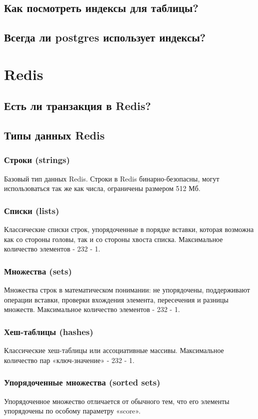 \section{Как посмотреть индексы для таблицы?}
\section{Всегда ли postgres использует индексы?}

\chapter{Redis}

\section{Есть ли транзакция в Redis?}
\section{Типы данных Redis}
\subsection{Строки (strings)}
Базовый тип данных Redis. Строки в Redis бинарно-безопасны, могут использоваться так же как числа, ограничены размером 512 Мб.
\subsection{Списки (lists)}
Классические списки строк, упорядоченные в порядке вставки, которая возможна как со стороны головы, так и со стороны хвоста списка. Максимальное количество элементов - 232 - 1.
\subsection{Множества (sets)}    
Множества строк в математическом понимании: не упорядочены, поддерживают операции вставки, проверки вхождения элемента, пересечения и разницы множеств. Максимальное количество элементов - 232 - 1.
\subsection{Хеш-таблицы (hashes)}    
Классические хеш-таблицы или ассоциативные массивы. Максимальное количество пар «ключ-значение» - 232 - 1.
\subsection{Упорядоченные множества (sorted sets)}
Упорядоченное множество отличается от обычного тем, что его элементы упорядочены по особому параметру «score».

